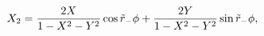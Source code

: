 \begin{equation}
X_2 = {2 X  \over 1-X^2-Y^2 }\cos \tilde r_- \phi + {2 Y \over
  1-X^2-Y^2 } \sin \tilde r_- \phi,
\end{equation}

